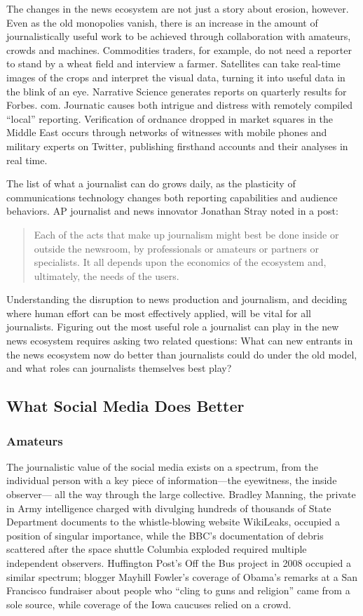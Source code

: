 The changes in the news ecosystem are not just a story about erosion, however.
Even as the old monopolies vanish, there is an increase in the amount of journalistically
useful work to be achieved through collaboration with amateurs, crowds
and machines. Commodities traders, for example, do not need a reporter to stand
by a wheat field and interview a farmer. Satellites can take real-time images of
the crops and interpret the visual data, turning it into useful data in the blink
of an eye. Narrative Science generates reports on quarterly results for Forbes.
com. Journatic causes both intrigue and distress with remotely compiled ``local''
reporting. Verification of ordnance dropped in market squares in the Middle East
occurs through networks of witnesses with mobile phones and military experts
on Twitter, publishing firsthand accounts and their analyses in real time.

The list of what a journalist can do grows daily, as the plasticity of communications
technology changes both reporting capabilities and audience behaviors. AP
journalist and news innovator Jonathan Stray noted in a post:

\begin{quote}Each of the acts that make up journalism might best be done inside
or outside the newsroom, by professionals or amateurs or partners or
specialists. It all depends upon the economics of the ecosystem and,
ultimately, the needs of the users.
\end{quote}

Understanding the disruption to news production and journalism, and deciding
where human effort can be most effectively applied, will be vital for all journalists.
Figuring out the most useful role a journalist can play in the new news
ecosystem requires asking two related questions: What can new entrants in the
news ecosystem now do better than journalists could do under the old model,
and what roles can journalists themselves best play?

\subsection{What Social Media Does Better} 

\subsubsection{Amateurs}
The journalistic value of the social media exists on a spectrum, from the individual
person with a key piece of information—the eyewitness, the inside observer—
all the way through the large collective. Bradley Manning, the private in Army
intelligence charged with divulging hundreds of thousands of State Department
documents to the whistle-blowing website WikiLeaks, occupied a position of
singular importance, while the BBC’s documentation of debris scattered after
the space shuttle Columbia exploded required multiple independent observers.
Huffington Post’s Off the Bus project in 2008 occupied a similar spectrum; blogger
Mayhill Fowler’s coverage of Obama’s remarks at a San Francisco fundraiser
about people who ``cling to guns and religion'' came from a sole source, while
coverage of the Iowa caucuses relied on a crowd.

